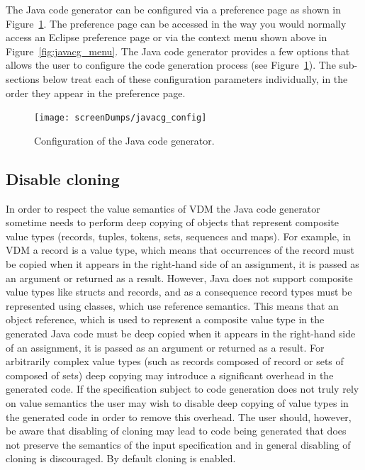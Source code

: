 The Java code generator can be configured via a preference page as
shown in Figure~\ref{fig:javacg_config}. The preference page can be
accessed in the way you would normally access an Eclipse preference
page or via the context menu shown above in
Figure~\ref{fig:javacg_menu}. The Java code generator provides a few
options that allows the user to configure the code generation process
(see Figure~\ref{fig:javacg_config}). The sub-sections below treat
each of these configuration parameters individually, in the order they
appear in the preference page.

\begin{figure}[htbp]
\begin{center}
\texttt{[image: screenDumps/javacg\_config]}
\caption{Configuration of the Java code generator.\label{fig:javacg_config}}
\end{center}
\end{figure}

\subsection{Disable cloning}

In order to respect the value semantics of VDM the Java code generator
sometime needs to perform deep copying of objects that represent
composite value types (records, tuples, tokens, sets, sequences and
maps). For example, in VDM a record is a value type, which means that
occurrences of the record must be copied when it appears in the
right-hand side of an assignment, it is passed as an argument or
returned as a result. However, Java does not support composite value
types like structs and records, and as a consequence record types must
be represented using classes, which use reference semantics. This
means that an object reference, which is used to represent a composite
value type in the generated Java code must be deep copied when it
appears in the right-hand side of an assignment, it is passed as an
argument or returned as a result. For arbitrarily complex value types
(such as records composed of record or sets of composed of sets) deep
copying may introduce a significant overhead in the generated code. If
the specification subject to code generation does not truly rely on
value semantics the user may wish to disable deep copying of value
types in the generated code in order to remove this overhead. The user
should, however, be aware that disabling of cloning may lead to code
being generated that does not preserve the semantics of the input
specification and in general disabling of cloning is discouraged. By
default cloning is enabled.

